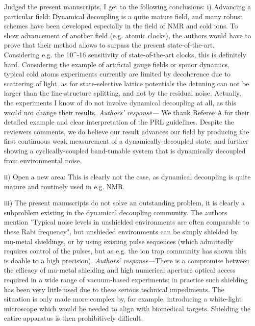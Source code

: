 \documentclass[letterpaper]{article}
\newenvironment{refcomment}{\singlespacing\verbatim}{\endverbatim}
\newcommand{\response}{\emph{Authors' response---}}
\begin{document}
\begin{refcomment}
Judged the present manuscripts, I get to the following conclusions: i)
Advancing a particular field: Dynamical decoupling is a quite mature
field, and many robust schemes have been developed especially in the
field of NMR and cold ions. To show advancement of another field (e.g.
atomic clocks), the authors would have to prove that their method
allows to surpass the present state-of-the-art. Considering e.g. the
10^-16 sensitivity of state-of-the-art clocks, this is definitely
hard. Considering the example of artificial gauge fields or spinor
dynamics, typical cold atoms experiments currently are limited by
decoherence due to scattering of light, as for state-selective lattice
potentials the detuning can not be larger than the fine-structure
splitting, and not by the residual noise. Actually, the experiments I
know of do not involve dynamical decoupling at all, as this would not
change their results.
\end{refcomment}
\response 
We thank Referee A for their detailed example and clear interpretation of the PRL guidelines.
Despite the reviewers comments, we do believe our result advances our field by producing the first continuous weak measurement of a dynamically-decoupled state; and further showing a cyclically-coupled band-tunable system that is dynamically decoupled from environmental noise. 

\begin{refcomment}
ii) Open a new area: This is clearly not the case, as dynamical
decoupling is quite mature and routinely used in e.g. NMR.

iii) The present manuscripts do not solve an outstanding problem, it
is clearly a subproblem existing in the dynamical decoupling
community. The authors mention "Typical noise levels in
unshielded environments are often comparable to these
Rabi frequency", but unshieded environments can be simply shielded
by mu-metal shieldings, or by using existing pulse sequences (which
admittedly requires control of the pulses, but as e.g. the ion trap
community has shown this is doable to a high precision).
\end{refcomment}
\response There is a compromise between the efficacy of mu-metal shielding and high numerical aperture optical access required in a wide range of vacuum-based experiments; in practice such shielding has been very little used due to these serious technical impediments. The situation is only made more complex by, for example, introducing a white-light microscope which would be needed to align with biomedical targets. Shielding the entire apparatus is then prohibitively difficult.
\end{document}
